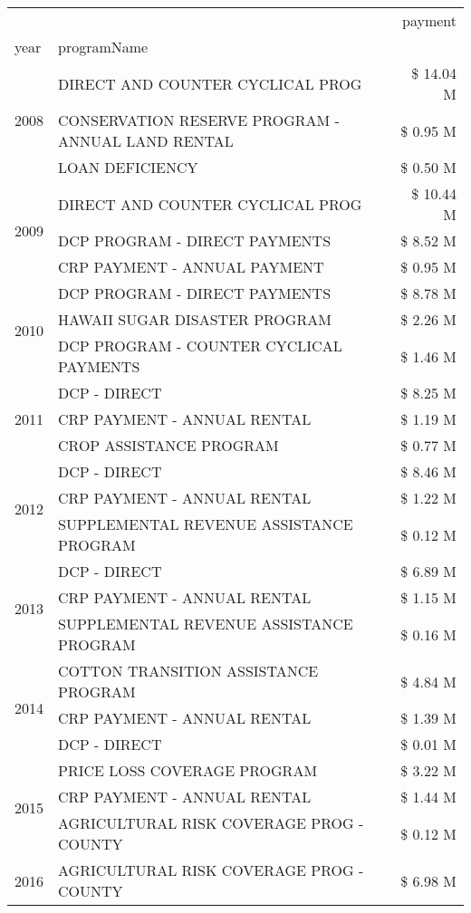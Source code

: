 \begin{tabular}{llr}
\toprule
 &  & payment \\
year & programName &  \\
\midrule
\multirow[t]{3}{*}{2008} & DIRECT AND COUNTER CYCLICAL PROG & \$ 14.04 M \\
 & CONSERVATION RESERVE PROGRAM - ANNUAL LAND RENTAL & \$ 0.95 M \\
 & LOAN DEFICIENCY & \$ 0.50 M \\
\cline{1-3}
\multirow[t]{3}{*}{2009} & DIRECT AND COUNTER CYCLICAL PROG & \$ 10.44 M \\
 & DCP PROGRAM - DIRECT PAYMENTS & \$ 8.52 M \\
 & CRP PAYMENT - ANNUAL PAYMENT & \$ 0.95 M \\
\cline{1-3}
\multirow[t]{3}{*}{2010} & DCP PROGRAM - DIRECT PAYMENTS & \$ 8.78 M \\
 & HAWAII SUGAR DISASTER PROGRAM & \$ 2.26 M \\
 & DCP PROGRAM - COUNTER CYCLICAL PAYMENTS & \$ 1.46 M \\
\cline{1-3}
\multirow[t]{3}{*}{2011} & DCP - DIRECT & \$ 8.25 M \\
 & CRP PAYMENT - ANNUAL RENTAL & \$ 1.19 M \\
 & CROP ASSISTANCE PROGRAM & \$ 0.77 M \\
\cline{1-3}
\multirow[t]{3}{*}{2012} & DCP - DIRECT & \$ 8.46 M \\
 & CRP PAYMENT - ANNUAL RENTAL & \$ 1.22 M \\
 & SUPPLEMENTAL REVENUE ASSISTANCE PROGRAM & \$ 0.12 M \\
\cline{1-3}
\multirow[t]{3}{*}{2013} & DCP - DIRECT & \$ 6.89 M \\
 & CRP PAYMENT - ANNUAL RENTAL & \$ 1.15 M \\
 & SUPPLEMENTAL REVENUE ASSISTANCE PROGRAM & \$ 0.16 M \\
\cline{1-3}
\multirow[t]{3}{*}{2014} & COTTON TRANSITION ASSISTANCE PROGRAM & \$ 4.84 M \\
 & CRP PAYMENT - ANNUAL RENTAL & \$ 1.39 M \\
 & DCP - DIRECT & \$ 0.01 M \\
\cline{1-3}
\multirow[t]{3}{*}{2015} & PRICE LOSS COVERAGE PROGRAM & \$ 3.22 M \\
 & CRP PAYMENT - ANNUAL RENTAL & \$ 1.44 M \\
 & AGRICULTURAL RISK COVERAGE PROG - COUNTY & \$ 0.12 M \\
\cline{1-3}
\multirow[t]{3}{*}{2016} & AGRICULTURAL RISK COVERAGE PROG - COUNTY & \$ 6.98 M \\

\end{tabular}
